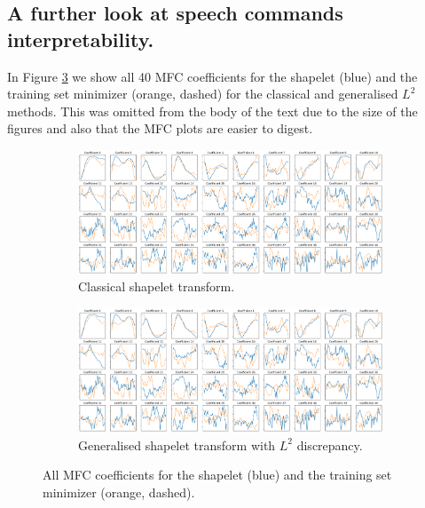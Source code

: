 \documentclass{article}
\theoremstyle{plain}
\theoremstyle{definition}
\begin{document}
    \subsection{A further look at speech commands interpretability.} \label{apx:further_speech_commands_interpretability}
	In Figure \ref{fig:speech_commands_axisplot} we show all 40 MFC coefficients for the shapelet (blue) and the training set minimizer (orange, dashed) for the classical and generalised $L^2$ methods. This was omitted from the body of the text due to the size of the figures and also that the MFC plots are easier to digest.
	\begin{figure}[t]
		\begin{subfigure}[b]{\linewidth}
			\centering
			\includegraphics[width=\linewidth]{images/new_speech_commands_axisplots.png}
			\caption{Classical shapelet transform.}
			\label{fig:old_speech_commands_axisplot}
		\end{subfigure}
		\begin{subfigure}[b]{\linewidth}
			\centering
			\includegraphics[width=\linewidth]{images/new_speech_commands_axisplots.png}
			\caption{Generalised shapelet transform with $L^2$ discrepancy.}
			\label{fig:new_speech_commands_axisplot}
		\end{subfigure}
		\caption{All MFC coefficients for the shapelet (blue) and the training set minimizer (orange, dashed).}
		\label{fig:speech_commands_axisplot}
	\end{figure}
\end{document}
